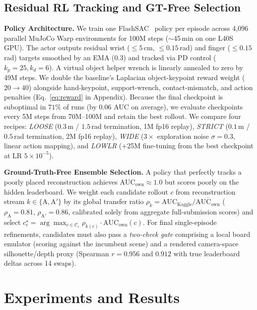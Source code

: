 \documentclass[10pt]{nvidiaextabstract}
\newcommand{\ownauc}{\ensuremath{\mathrm{AUC}_{\text{own}}}\xspace}
\begin{document}
\subsection{Residual RL Tracking and GT-Free Selection}
\label{sec:policy}

\textbf{Policy Architecture.} We train one FlashSAC~\cite{flashchord,haarnoja2018sac} policy per episode across 4,096 parallel MuJoCo Warp environments for 100M steps ($\sim$45\,min on one L40S GPU). The actor outputs residual wrist ($\le 5$\,cm, $\le 0.15$\,rad) and finger ($\le 0.15$\,rad) targets smoothed by an EMA ($0.3$) and tracked via PD control ($k_p=25, k_d=6$). A virtual object helper wrench is linearly annealed to zero by 49M steps. We double the baseline's Laplacian object-keypoint reward weight ($20 \rightarrow 40$) alongside hand-keypoint, support-wrench, contact-mismatch, and action penalties (Eq.~\ref{eq:reward} in Appendix). Because the final checkpoint is suboptimal in $71\%$ of runs (by $0.06$ AUC on average), we evaluate checkpoints every 5M steps from 70M--100M and retain the best rollout. We compare four recipes: \emph{LOOSE} ($0.3$\,m / $1.5$\,rad termination, 1M fp16 replay), \emph{STRICT} ($0.1$\,m / $0.5$\,rad termination, 2M fp16 replay), \emph{WIDE} ($3\times$ exploration noise $\sigma=0.3$, linear action mapping), and \emph{LOWLR} (+25M fine-tuning from the best checkpoint at LR $5\times 10^{-5}$).

\textbf{Ground-Truth-Free Ensemble Selection.} A policy that perfectly tracks a poorly placed reconstruction achieves $\ownauc \approx 1.0$ but scores poorly on the hidden leaderboard. We weight each candidate rollout $c$ from reconstruction stream $k \in \{\text{A}, \text{A}'\}$ by its global transfer ratio $\rho_k = \mathrm{AUC}_{\text{Kaggle}} / \overline{\ownauc}$ ($\rho_{\text{A}} = 0.81$, $\rho_{\text{A}'} = 0.86$, calibrated solely from aggregate full-submission scores) and select $c^\star_e = \arg\max_{c \in \mathcal{C}_e} \rho_{k(c)} \cdot \ownauc(c)$. For final single-episode refinements, candidates must also pass a \emph{two-check gate} comprising a local board emulator (scoring against the incumbent scene) and a rendered camera-space silhouette/depth proxy (Spearman $r=0.956$ and $0.912$ with true leaderboard deltas across 14 swaps).

\section{Experiments and Results}
\label{sec:experiments}
\end{document}
